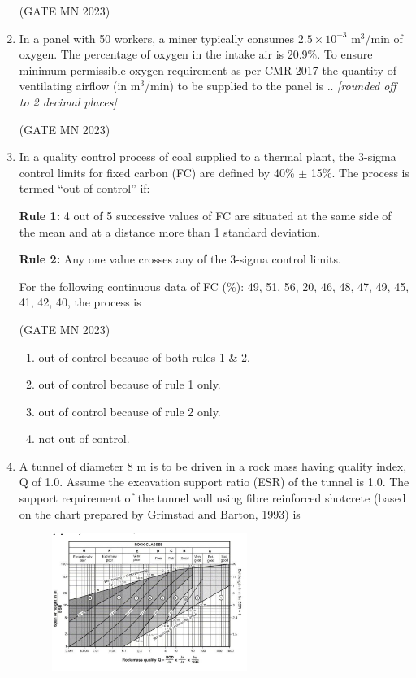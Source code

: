 \documentclass[journal]{IEEEtran}
\begin{document}
\begin{enumerate}
\hfill(GATE MN 2023)
\item In a panel with 50 workers, a miner typically consumes $2.5 \times 10^{-3}$ m$^3$/min of oxygen. The percentage of oxygen in the intake air is 20.9\%. To ensure minimum permissible oxygen requirement as per CMR 2017 the quantity of ventilating airflow (in m$^3$/min) to be supplied to the panel is \underline{\hspace{2cm}}..  
\textit{[rounded off to 2 decimal places]}


\hfill(GATE MN 2023)
\item In a quality control process of coal supplied to a thermal plant, the 3-sigma control limits for fixed carbon (FC) are defined by 40\% $\pm$ 15\%. The process is termed ``out of control'' if:  

\textbf{Rule 1:} 4 out of 5 successive values of FC are situated at the same side of the mean and at a distance more than 1 standard deviation.  

\textbf{Rule 2:} Any one value crosses any of the 3-sigma control limits.  

For the following continuous data of FC (\%): 49, 51, 56, 20, 46, 48, 47, 49, 45, 41, 42, 40, the process is  


\hfill(GATE MN 2023)
\begin{enumerate}
    \item out of control because of both rules 1 \& 2.
    \item out of control because of rule 1 only.
    \item out of control because of rule 2 only.
    \item not out of control.
\end{enumerate}

\item A tunnel of diameter 8 m is to be driven in a rock mass having quality index, Q of 1.0. Assume the excavation support ratio (ESR) of the tunnel is 1.0. The support requirement of the tunnel wall using fibre reinforced shotcrete (based on the chart prepared by Grimstad and Barton, 1993) is  

    \begin{figure}[H]
    \centering
\includegraphics[width=0.6\textwidth]{Screenshot_2025_0822_122706.png}
\caption{}
    \label{fig:37}
\end{figure}



\end{enumerate}
\end{document}
